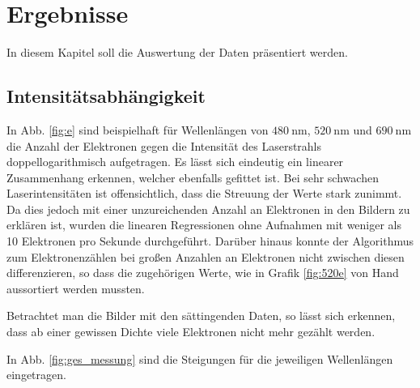 \documentclass[bachelor,       %
               twoside,        %
               BCOR10mm,       %
               english,ngerman, %
               ]{GAUBM}
\begin{document}


\chapter{Ergebnisse}
In diesem Kapitel soll die Auswertung der Daten präsentiert werden.

\section{Intensitätsabhängigkeit}
In Abb. \ref{fig:e} sind beispielhaft für Wellenlängen von $\SI{480}{\nano\meter}$, $\SI{520}{\nano\meter}$ und $\SI{690}{\nano\meter}$ die Anzahl der Elektronen gegen die Intensität des Laserstrahls doppellogarithmisch aufgetragen.
Es lässt sich eindeutig ein linearer Zusammenhang erkennen, welcher ebenfalls gefittet ist.
Bei sehr schwachen Laserintensitäten ist offensichtlich, dass die Streuung der Werte stark zunimmt.
Da dies jedoch mit einer unzureichenden Anzahl an Elektronen in den Bildern zu erklären ist, wurden die linearen Regressionen ohne Aufnahmen mit weniger als 10 Elektronen pro Sekunde durchgeführt.
Darüber hinaus konnte der Algorithmus zum Elektronenzählen bei großen Anzahlen an Elektronen nicht zwischen diesen differenzieren, so dass die zugehörigen Werte, wie in Grafik \ref{fig:520e} von Hand aussortiert werden mussten.

Betrachtet man die Bilder mit den sättingenden Daten, so lässt sich erkennen, dass ab einer gewissen Dichte viele Elektronen nicht mehr gezählt werden.


In Abb. \ref{fig:ges_messung} sind die Steigungen für die jeweiligen Wellenlängen eingetragen.\newline\newline
\end{document}
